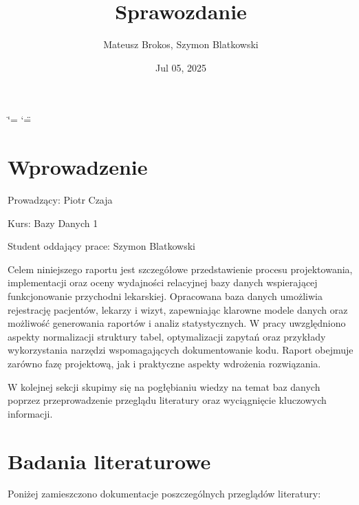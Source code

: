 \documentclass[a4paper,11pt,openany,english]{sphinxmanual}
\title{Sprawozdanie}
\date{Jul 05, 2025}
\author{Mateusz Brokos, Szymon Blatkowski}
\begin{document}
\ifdefined\shorthandoff
  \ifnum\catcode`\=\string=\active\shorthandoff{=}\fi
  \ifnum\catcode`\"=\active{}\fi
\fi

\pagestyle{empty}
\sphinxmaketitle
\pagestyle{plain}
\tableofcontents
\pagestyle{normal}
\label{\detokenize{index::doc}}


\sphinxstepscope


\chapter{Wprowadzenie}
\label{\detokenize{rozdzial1/index:wprowadzenie}}\label{\detokenize{rozdzial1/index::doc}}
\sphinxAtStartPar
Prowadzący: Piotr Czaja

\sphinxAtStartPar
Kurs: Bazy Danych 1

\sphinxAtStartPar
Student oddający prace: Szymon Blatkowski

\sphinxAtStartPar
Celem niniejszego raportu jest szczegółowe przedstawienie procesu projektowania, implementacji oraz oceny wydajności relacyjnej bazy danych wspierającej funkcjonowanie przychodni lekarskiej. Opracowana baza danych umożliwia rejestrację pacjentów, lekarzy i wizyt, zapewniając klarowne modele danych oraz możliwość generowania raportów i analiz statystycznych. W pracy uwzględniono aspekty normalizacji struktury tabel, optymalizacji zapytań oraz przykłady wykorzystania narzędzi wspomagających dokumentowanie kodu. Raport obejmuje zarówno fazę projektową, jak i praktyczne aspekty wdrożenia rozwiązania.

\sphinxAtStartPar
W kolejnej sekcji skupimy się na pogłębianiu wiedzy na temat baz danych poprzez przeprowadzenie przeglądu literatury oraz wyciągnięcie kluczowych informacji.

\sphinxstepscope


\chapter{Badania literaturowe}
\label{\detokenize{rozdzial2/index:badania-literaturowe}}\label{\detokenize{rozdzial2/index::doc}}
\sphinxAtStartPar
Poniżej zamieszczono dokumentacje poszczególnych przeglądów literatury:

\sphinxstepscope
\end{document}

